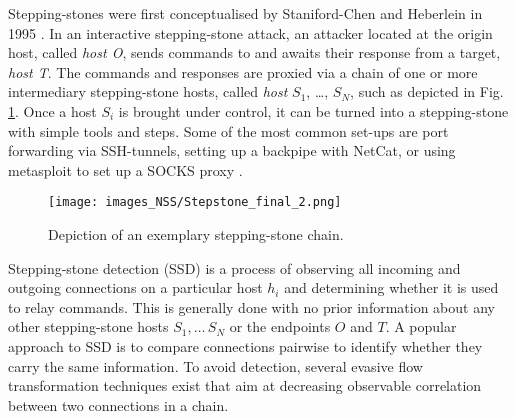  
Stepping-stones were first conceptualised by Staniford-Chen and Heberlein in 1995 \cite{staniford1995holding}. In an interactive stepping-stone attack, an attacker located at the origin host, called \textit{host O}, sends commands to and awaits their response from a target, \textit{host T}. The commands and responses are proxied via a chain of one or more intermediary stepping-stone hosts, called \textit{host} $S_1$, \dots, $S_N$, such as depicted in Fig. \ref{figN:Stepstone}. 
Once a host $S_i$ is brought under control, it can be turned into a stepping-stone with simple tools and steps. Some of the most common set-ups are port forwarding via SSH-tunnels, setting up a backpipe with NetCat, or using metasploit to set up a SOCKS proxy \cite{pivoting2015}.


\begin{figure}
\centering
\texttt{[image: images\_NSS/Stepstone\_final\_2.png]}
\caption{Depiction of an exemplary stepping-stone chain.}\label{figN:Stepstone}
\vspace{-0.6cm}
\end{figure}


Stepping-stone detection (SSD) is a process of observing all incoming and outgoing connections on a particular host $h_i$ and determining whether it is used to relay commands. This is generally done with no prior information about any other stepping-stone hosts $S_1,\dots\,S_N$ or the endpoints $O$ and $T$. A popular approach to SSD is to compare connections pairwise to identify whether they carry the same information. To avoid detection, several evasive flow transformation techniques exist that aim at decreasing observable correlation between two connections in a chain. 
 
